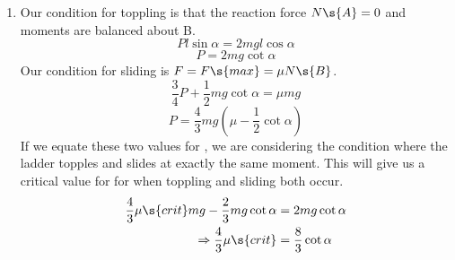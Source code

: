 \begin{problem}[A1987FMIIQ1l]
{\begin{enumerate}
\begin{enumerate}
\begin{equation*}	
Pl\sin{\alpha} + 4N\s{A}\sin{\alpha} = 2mgl\cos{\alpha}	
\end{equation*}
\begin{equation*}	
4N\s{A}\sin{\alpha} = 2mg\cos{\alpha} - P\sin{\alpha}	
\end{equation*}
		\item \answer[b]{} Resolving horizontally on the ladder:
\begin{equation*}	
N\s{A} + P = F 	
\end{equation*}
\begin{equation*}	
F = \frac{1}{2}mg\cot{\alpha} - \frac{1}{4}P + P 	
\end{equation*}
\begin{equation*}	
F = \frac{3}{4}P + \frac{1}{2}mg\cot{\alpha} 	
\end{equation*}
	\end{enumerate}
	\item Our condition for toppling is that the reaction force $N\s{A} = 0$ and moments are balanced about B.
\begin{equation*}	
Pl\sin{\alpha} = 2mgl\cos{\alpha}	
\end{equation*}
\begin{equation*}	
P = 2mg\cot{\alpha}	
\end{equation*}
Our condition for sliding is $F = F\s{max} = \mu N\s{B}$.
\begin{equation*}
\frac{3}{4}P + \frac{1}{2}mg\cot{\alpha} = \mu mg	
\end{equation*}
\begin{equation*}
 P = \frac{4}{3}mg\left(\mu - \frac{1}{2}\cot{\alpha}\right)	
 \end{equation*}
 If we equate these two values for , we are considering the condition where the ladder topples and slides at exactly the same moment. This will give us a critical value for \vari{\mu} for when toppling and sliding both occur.
 \begin{align*}
\frac{4}{3}\mu\s{crit} mg - \frac{2}{3}mg\cot{\alpha}&= 2mg\cot{\alpha} \\
\Rightarrow \frac{4}{3}\mu\s{crit}&= \frac{8}{3}\cot{\alpha} \\

\end{align*}
\end{enumerate}}
\end{problem}
